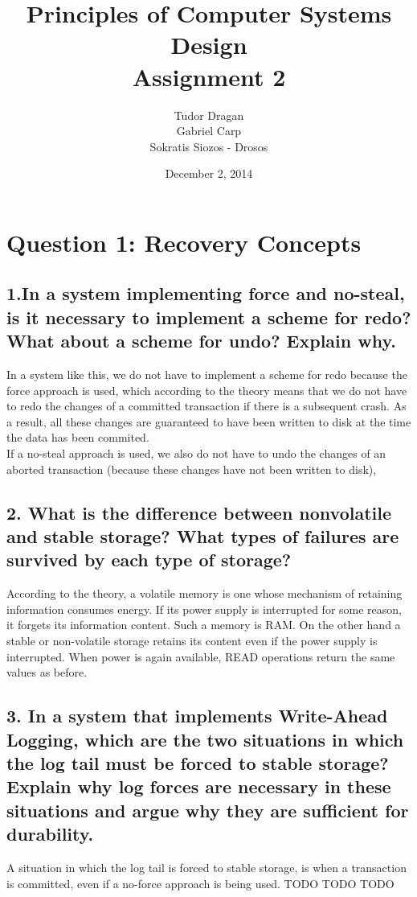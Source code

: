 \documentclass{article}      %
\title{\bf Principles of Computer Systems Design\\ {\Large Assignment 2}}  %
\author{Tudor Dragan\\
Gabriel Carp\\
Sokratis Siozos - Drosos}      %
\date{December 2, 2014}      %
\begin{document}

\maketitle                   %

\section*{Question 1: Recovery Concepts} 


\subsection*{1.In a system implementing force and no-steal, is it necessary to implement a scheme for redo? What about a scheme for undo? Explain why.}

In a system like this, we do not have to implement a scheme for redo because the force approach is used, which according to the theory means that we do not have to redo the changes of a committed transaction if there is a subsequent crash. As a result, all these changes are guaranteed to have been written to disk at the time the data has been commited. \\

If a no-steal approach is used, we also do not have to undo the changes of an aborted transaction (because these changes have not been written to disk),\\


\subsection*{2.  What is the difference between nonvolatile and stable storage? What types of failures are survived by each type of storage?}

According to the theory, a volatile memory is one whose mechanism of retaining information consumes energy. If its power supply is interrupted for some reason, it forgets its information content. Such a memory is RAM. On the other hand a stable or non-volatile storage retains its content even if the power supply is interrupted. When power is again available, READ operations return the same values as before.\\

\subsection*{3.  In a system that implements Write-Ahead Logging, which are the two situations in which the log tail must be forced to stable storage? Explain why log forces are necessary in these situations and argue why they are sufficient for durability.}
A situation in which the log tail is forced to stable storage, is when a transaction is committed, even if a no-force approach is being used.
TODO TODO TODO\\
\end{document}
